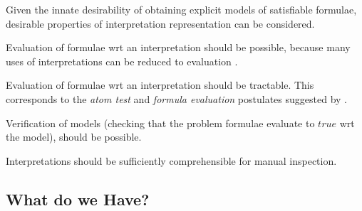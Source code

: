 \documentclass{easychair}
\newenvironment{packed_itemize}{
\vspace*{-0.3em}
\begin{itemize}
\setlength{\partopsep}{0pt}
\setlength{\itemsep}{1pt}
\setlength{\parskip}{0pt}
\setlength{\parsep}{0pt}
}{\end{itemize}}
\begin{document}
Given the innate desirability of obtaining explicit models of satisfiable formulae, desirable
properties of interpretation representation can be considered.
\begin{packed_itemize}
\item Evaluation of formulae wrt an interpretation should be possible, because many uses of
      interpretations can be reduced to evaluation \cite[\S3.2]{CLP04}.
\item Evaluation of formulae wrt an interpretation should be tractable.
      This corresponds to the \emph{atom test} and \emph{formula evaluation} postulates suggested
      by \cite{FL96,CLP04}.
\item Verification of models (checking that the problem formulae evaluate to $true$ wrt the model), 
      should be possible.
\item Interpretations should be sufficiently comprehensible for manual inspection.
\end{packed_itemize}

\subsection{What do we Have?}
\label{Have}
\end{document}
